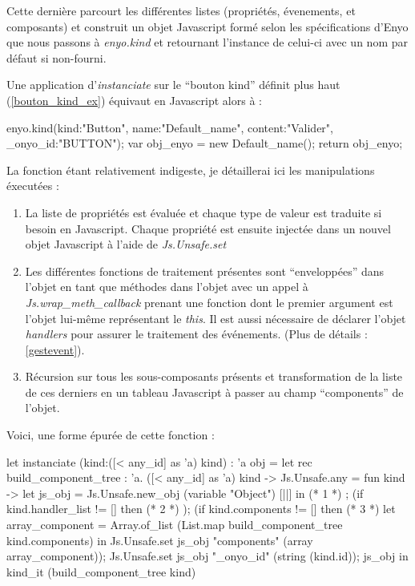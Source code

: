 Cette dernière parcourt les différentes listes (propriétés, évenements, et composants) et construit
un objet Javascript formé selon les spécifications d'Enyo que nous passons à \emph{enyo.kind} et 
retournant l'instance de celui-ci avec un nom par défaut si non-fourni.

Une application d'\emph{instanciate} sur le ``bouton kind'' définit plus haut (\ref{bouton_kind_ex}) 
équivaut en Javascript alors à :

\begin{JavaScript}
  enyo.kind({kind:"Button", name:"Default_name", content:"Valider", _onyo_id:"BUTTON"});
  var obj_enyo = new Default_name();
  return obj_enyo;
\end{JavaScript}

La fonction étant relativement indigeste, je détaillerai ici les manipulations éxecutées :

\begin{enumerate}
\item La liste de propriétés est évaluée et chaque type de valeur est traduite si besoin en Javascript.
  Chaque propriété est ensuite injectée dans un nouvel objet Javascript à l'aide de \emph{Js.Unsafe.set}
\item \label{wrap_meth} 
  Les différentes fonctions de traitement présentes sont ``enveloppées'' dans l'objet en tant que méthodes
  dans l'objet avec un appel à \\\emph{Js.wrap\_meth\_callback} prenant une fonction dont le premier argument
  est l'objet lui-même représentant le \emph{this}. Il est aussi nécessaire de déclarer l'objet
  \emph{handlers} pour assurer le traitement des événements.
  (Plus de détails : \ref{gestevent}).
\item Récursion sur tous les sous-composants présents et transformation de la liste de ces derniers en 
  un tableau Javascript à passer au champ ``components'' de l'objet.
\end{enumerate}

Voici, une forme épurée de cette fonction :

\begin{OCaml}
    let instanciate (kind:([< any_id] as 'a) kind) : 'a obj =
      let rec build_component_tree : 'a. ([< any_id] as 'a) kind -> Js.Unsafe.any = fun kind ->
          let js_obj = Js.Unsafe.new_obj (variable "Object") [||]
          in
          (* 1 *)
          ;
          (if kind.handler_list != [] then
              (* 2 *)
          );
          (if kind.components != []  then
              (* 3 *)
              let array_component = Array.of_list (List.map build_component_tree kind.components) in
	      Js.Unsafe.set js_obj "components" (array array_component));
          Js.Unsafe.set js_obj "_onyo_id" (string (kind.id));
          js_obj in
       kind_it (build_component_tree kind)
\end{OCaml}

